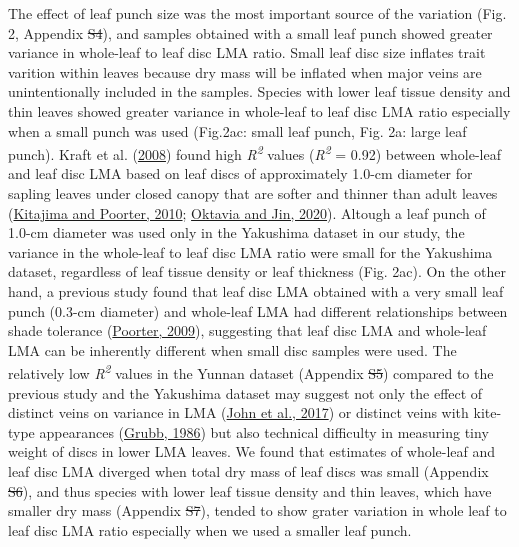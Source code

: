 \documentclass[
  12pt,
  a4paper,
,tablecaptionabove
]{scrartcl}
\providecommand{\DIFaddtex}[1]{{\protect\color{blue}\uwave{#1}}} %
\providecommand{\DIFdeltex}[1]{{\protect\color{red}\sout{#1}}}                      %
\providecommand{\DIFaddbegin}{} %
\providecommand{\DIFaddend}{} %
\providecommand{\DIFdelbegin}{} %
\providecommand{\DIFdelend}{} %
\providecommand{\DIFadd}[1]{\texorpdfstring{\DIFaddtex{#1}}{#1}} %
\providecommand{\DIFdel}[1]{\texorpdfstring{\DIFdeltex{#1}}{}} %
\begin{document}
The effect of leaf punch size was the most important source of the variation (Fig. 2, Appendix \DIFdelbegin \DIFdel{S4}\DIFdelend \DIFaddbegin \DIFadd{S1, Figure S3}\DIFaddend ), and samples obtained with a small leaf punch showed greater variance in whole-leaf to leaf disc LMA ratio.
Small leaf disc size inflates trait varition within leaves because dry mass will be inflated when major veins are unintentionally included in the samples.
Species with lower leaf tissue density and thin leaves showed greater variance in whole-leaf to leaf disc LMA ratio especially when a small punch was used (Fig.2ac: small leaf punch, Fig. 2a: large leaf punch).
Kraft et al. (\protect\hyperlink{ref-Kraft2008}{2008}) found high \emph{R\textsuperscript{2}} values (\emph{R\textsuperscript{2}} = 0.92) between whole-leaf and leaf disc LMA based on leaf discs of approximately 1.0-cm diameter for sapling leaves under closed canopy that are softer and thinner than adult leaves (\protect\hyperlink{ref-Kitajima2010}{Kitajima and Poorter, 2010}; \protect\hyperlink{ref-Oktavia2020}{Oktavia and Jin, 2020}).
Altough a leaf punch of 1.0-cm diameter was used only in the Yakushima dataset in our study, the variance in the whole-leaf to leaf disc LMA ratio were small for the Yakushima dataset, regardless of leaf tissue density or leaf thickness (Fig. 2ac).
On the other hand, a previous study found that leaf disc LMA obtained with a very small leaf punch (0.3-cm diameter) and whole-leaf LMA had different relationships between shade tolerance (\protect\hyperlink{ref-Poorter2009a}{Poorter, 2009}), suggesting that leaf disc LMA and whole-leaf LMA can be inherently different when small disc samples were used.
The relatively low \emph{R\textsuperscript{2}} values in the Yunnan dataset (Appendix \DIFdelbegin \DIFdel{S5}\DIFdelend \DIFaddbegin \DIFadd{S1, Figure S4}\DIFaddend ) compared to the previous study and the Yakushima dataset may suggest not only the effect of distinct veins on variance in LMA (\protect\hyperlink{ref-John2017}{John et al., 2017}) or distinct veins with kite-type appearances (\protect\hyperlink{ref-Grubb1986}{Grubb, 1986}) but also technical difficulty in measuring tiny weight of discs in lower LMA leaves.
We found that estimates of whole-leaf and leaf disc LMA diverged when total dry mass of leaf discs was small (Appendix \DIFdelbegin \DIFdel{S6}\DIFdelend \DIFaddbegin \DIFadd{S1, Figure S5}\DIFaddend ), and thus species with lower leaf tissue density and thin leaves, which have smaller dry mass (Appendix \DIFdelbegin \DIFdel{S7}\DIFdelend \DIFaddbegin \DIFadd{S1, Table S2}\DIFaddend ), tended to show grater variation in whole leaf to leaf disc LMA ratio especially when we used a smaller leaf punch.
\end{document}
